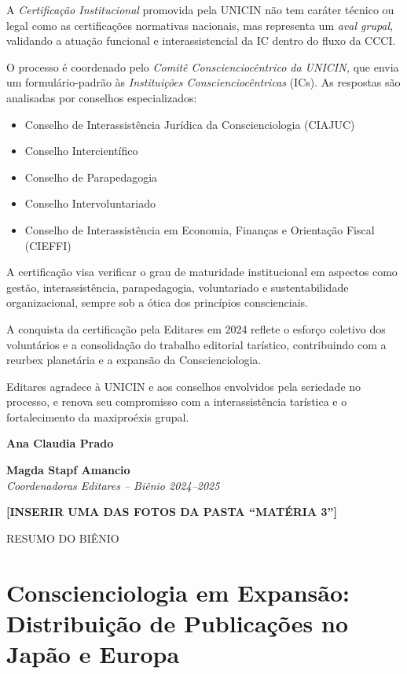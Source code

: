 \documentclass[
]{article}
\begin{document}
A \emph{Certificação Institucional} promovida pela UNICIN não tem caráter técnico ou legal como as certificações normativas nacionais, mas representa um \emph{aval grupal,} validando a atuação funcional e interassistencial da IC dentro do fluxo da CCCI.

O processo é coordenado pelo \emph{Comitê Conscienciocêntrico da UNICIN,} que envia um formulário-padrão às \emph{Instituições Conscienciocêntricas} (ICs). As respostas são analisadas por conselhos especializados:

\begin{itemize}
\item
  Conselho de Interassistência Jurídica da Conscienciologia (CIAJUC)
\item
  Conselho Intercientífico
\item
  Conselho de Parapedagogia
\item
  Conselho Intervoluntariado
\item
  Conselho de Interassistência em Economia, Finanças e Orientação Fiscal (CIEFFI)
\end{itemize}

A certificação visa verificar o grau de maturidade institucional em aspectos como gestão, interassistência, parapedagogia, voluntariado e sustentabilidade organizacional, sempre sob a ótica dos princípios conscienciais.

A conquista da certificação pela Editares em 2024 reflete o esforço coletivo dos voluntários e a consolidação do trabalho editorial tarístico, contribuindo com a reurbex planetária e a expansão da Conscienciologia.

Editares agradece à UNICIN e aos conselhos envolvidos pela seriedade no processo, e renova seu compromisso com a interassistência tarística e o fortalecimento da maxiproéxis grupal.

\textbf{Ana Claudia Prado}

\textbf{Magda Stapf Amancio\\
}\emph{Coordenadoras Editares -- Biênio 2024--2025}

\textbf{{[}INSERIR UMA DAS FOTOS DA PASTA ``MATÉRIA 3''{]}}

RESUMO DO BIÊNIO

\section{\texorpdfstring{Conscienciologia em Expansão: Distribuição de Publicações no\\
Japão e Europa}{Conscienciologia em Expansão: Distribuição de Publicações no Japão e Europa}}\label{conscienciologia-em-expansuxe3o-distribuiuxe7uxe3o-de-publicauxe7uxf5es-no-japuxe3o-e-europa}
\end{document}
